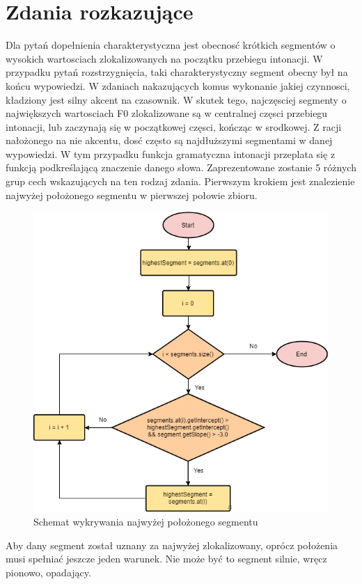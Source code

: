 \documentclass[a4paper,12 pt]{report}
\begin{document}
\section{Zdania rozkazujące}
Dla pytań dopełnienia charakterystyczna jest obecnosć krótkich segmentów o wysokich wartosciach zlokalizowanych na początku przebiegu intonacji. W przypadku pytań rozstrzygnięcia, taki charakterystyczny segment obecny był na końcu wypowiedzi. W zdaniach nakazujących komus wykonanie jakiej czynnosci, kładziony jest silny akcent na czasownik. W skutek tego, najczęsciej segmenty o największych wartosciach F0 zlokalizowane są w centralnej częsci przebiegu intonacji, lub zaczynają się w początkowej częsci, kończąc w srodkowej. Z racji nałożonego na nie akcentu, dosć często są najdłuższymi segmentami w danej wypowiedzi. W tym przypadku funkcja gramatyczna intonacji przeplata się z funkcją podkreślającą znaczenie danego słowa. Zaprezentowane zostanie 5 różnych grup cech wskazujących na ten rodzaj zdania.
Pierwszym krokiem jest znalezienie najwyżej położonego segmentu w pierwszej połowie zbioru.
 \FloatBarrier
\begin{figure}[h]
\centering
\includegraphics[scale=0.9]{HighestDetection.png}
\caption{Schemat wykrywania najwyżej położonego segmentu}
\end{figure}
\FloatBarrier
Aby dany segment został uznany za najwyżej zlokalizowany, oprócz położenia musi spełniać jeszcze jeden warunek. Nie może być to segment silnie, wręcz pionowo, opadający.
\end{document}
